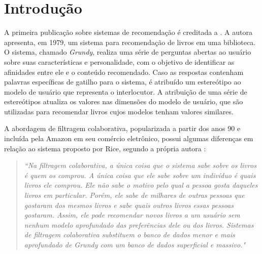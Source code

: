 \section{Introdução}

A primeira publicação sobre sistemas de recomendação é creditada a
\citet{rich1979user}. A autora apresenta, em 1979, um sistema para recomendação de livros
em uma biblioteca. O sistema, chamado \textit{Grundy}, realiza uma série de
perguntas abertas ao usuário sobre suas características e personalidade, com o objetivo
de identificar as afinidades entre ele e o conteúdo recomendado. Caso as
respostas contenham palavras específicas de gatilho para o sistema, é atribuído
um estereótipo ao modelo de usuário que representa o interlocutor. A atribuição
de uma série de estereótipos atualiza os valores nas dimensões do modelo de
usuário, que são utilizadas para recomendar livros cujos modelos tenham valores
similares.


A abordagem de filtragem colaborativa, popularizada a partir dos anos 90 e
incluída pela Amazon \cite{amazon2017} em seu comércio eletrônico, possui
algumas diferenças em relação ao sistema proposto por Rice, segundo a própria
autora \cite{rich:homepage}:

\begin{quotation}\small\noindent \textit{``Na filtragem colaborativa, a única
   coisa que o sistema sabe sobre os livros é quem os comprou. A única coisa que
   ele sabe sobre um indivíduo é quais livros ele comprou. Ele não sabe o motivo
   pelo qual a pessoa gosta daqueles livros em particular. Porém, ele sabe de
   milhares de outras pessoas que gostaram dos mesmos livros e sabe quais outros
   livros essas pessoas gostaram. Assim, ele pode recomendar novos livros a um
   usuário sem nenhum modelo aprofundado das preferências dele ou dos livros.
   Sistemas de filtragem colaborativa substituem o banco de dados menor e mais
   aprofundado de Grundy com um banco de dados superficial e massivo."}
   \end{quotation}




